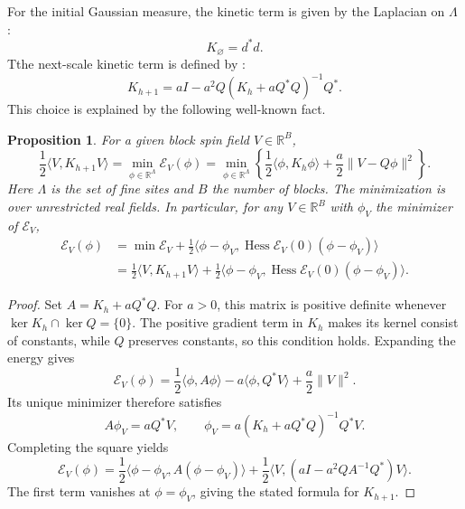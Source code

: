 \documentclass[11pt]{article}
\newcommand{\R}{\mathbb R}
\newcommand{\Id}{I}
\numberwithin{equation}{section}
\newtheorem{proposition}[theorem]{Proposition}
\theoremstyle{definition}
\theoremstyle{plain}
\begin{document}
For the initial Gaussian measure, the kinetic term is given by the Laplacian on $\Lambda$ \cite[above (3.4)]{OpenAI-O3}:
\begin{equation}
  K_{\varnothing} = d^* d.
\end{equation}
Tthe next-scale kinetic term is defined by \cite[(3.4)]{OpenAI-O3}:
\begin{equation}
K_{h+1} = a\Id-a^2Q(K_h+aQ^*Q)^{-1}Q^*.
\end{equation}
This choice is explained by the following well-known fact.

\begin{proposition}
For a given block spin field $V\in\R^B$, 
\begin{equation} \label{eq:Gauss-var}
 \frac12\langle V,K_{h+1}V\rangle
 =\min_{\phi\in\R^\Lambda} \mathcal E_V(\phi)
 =\min_{\phi\in\R^\Lambda}
 \left\{\frac12\langle\phi,K_h\phi\rangle
              +\frac a2\|V-Q\phi\|^2\right\}.
\end{equation}
Here $\Lambda$ is the set of fine sites and $B$ the number
of blocks.  The minimization is over unrestricted real fields.
%
In particular, for any $V \in \R^B$ with $\phi_V$ the minimizer of $\mathcal E_V$,
\begin{equation}
\begin{aligned}
  \mathcal E_V(\phi)
  &= \min \mathcal E_V + \frac12 \langle \phi-\phi_V, \operatorname{Hess} \mathcal E_V(0)(\phi-\phi_V)\rangle 
  \\
  &= \frac12 \langle V, K_{h+1} V\rangle + \frac12 \langle \phi-\phi_V, \operatorname{Hess} \mathcal E_V(0)(\phi-\phi_V)\rangle 
  .
\end{aligned}
\end{equation}
\end{proposition}

\begin{proof}
Set $A=K_h+aQ^*Q$. For $a>0$, this matrix is positive definite whenever $\ker K_h\cap\ker Q=\{0\}$.
The positive gradient term in $K_h$ makes its kernel consist of constants, while
$Q$ preserves constants, so this condition holds.
Expanding the energy gives
\begin{equation}
 \mathcal E_V(\phi)
 =\frac12\langle\phi,A\phi\rangle
  -a\langle\phi,Q^*V\rangle+\frac a2\|V\|^2.
\end{equation}
Its unique minimizer therefore satisfies
\begin{equation}
 A\phi_V=aQ^*V,\qquad
 \phi_V=a(K_h+aQ^*Q)^{-1}Q^*V.
\end{equation}
Completing the square yields
\begin{equation}
 \mathcal E_V(\phi)
 =\frac12\langle\phi-\phi_V,A(\phi-\phi_V)\rangle
  +\frac12\langle V,(a\Id-a^2QA^{-1}Q^*)V\rangle.
\end{equation}
The first term vanishes at $\phi=\phi_V$, giving the stated formula
for $K_{h+1}$.
\end{proof}
\end{document}
